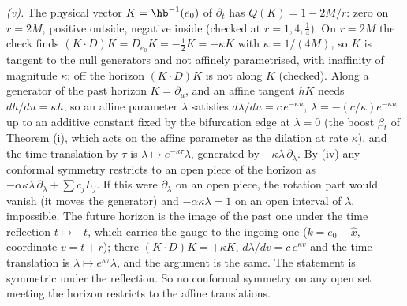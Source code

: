 \emph{(v).} The physical vector $K = \hb^{-1}(e_{0})$ of $\partial_{t}$ has $Q(K) = 1 - 2M/r$: zero on $r = 2M$, positive outside, negative inside (checked at $r = 1, 4, \tfrac14$). On $r = 2M$ the check finds $(K\cdot D)K = D_{e_{0}}K = -\tfrac12 K = -\kappa K$ with $\kappa = 1/(4M)$, so $K$ is tangent to the null generators and not affinely parametrised, with inaffinity of magnitude $\kappa$; off the horizon $(K\cdot D)K$ is not along $K$ (checked). Along a generator of the past horizon $K = \partial_{u}$, and an affine tangent $h K$ needs $dh/du = \kappa h$, so an affine parameter $\lambda$ satisfies $d\lambda/du = c\,e^{-\kappa u}$, $\lambda = -(c/\kappa)e^{-\kappa u}$ up to an additive constant fixed by the bifurcation edge at $\lambda = 0$ (the boost $\beta_{t}$ of Theorem (i), which acts on the affine parameter as the dilation at rate $\kappa$), and the time translation by $\tau$ is $\lambda \mapsto e^{-\kappa\tau}\lambda$, generated by $-\kappa\lambda\,\partial_{\lambda}$. By (iv) any conformal symmetry restricts to an open piece of the horizon as $-\alpha\kappa\lambda\,\partial_{\lambda} + \sum c_{j}L_{j}$. If this were $\partial_{\lambda}$ on an open piece, the rotation part would vanish (it moves the generator) and $-\alpha\kappa\lambda = 1$ on an open interval of $\lambda$, impossible. The future horizon is the image of the past one under the time reflection $t \mapsto -t$, which carries the gauge to the ingoing one ($k = e_{0} - \hat{x}$, coordinate $v = t + r$); there $(K\cdot D)K = +\kappa K$, $d\lambda/dv = c\,e^{\kappa v}$ and the time translation is $\lambda \mapsto e^{\kappa\tau}\lambda$, and the argument is the same. The statement is symmetric under the reflection. So no conformal symmetry on any open set meeting the horizon restricts to the affine translations.

